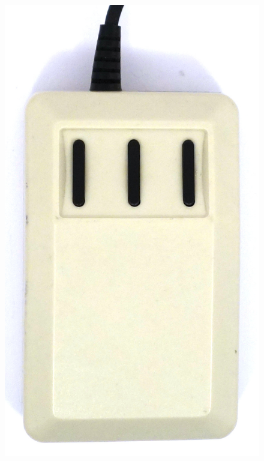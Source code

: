 \documentclass[11pt, a4paper]{article}
\begin{document}
\begin{figure}[h]
    \centering
    \includegraphics[scale=0.7]{1986_american_mouse/top_60.jpg}

\end{figure}
\end{document}
